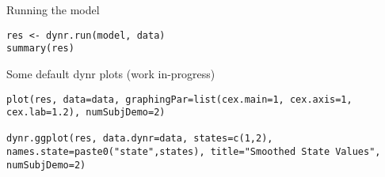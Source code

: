 \begin{frame}[fragile]{Running the model}

\begin{verbatim}
res <- dynr.run(model, data)
summary(res)
\end{verbatim}

\end{frame}

\begin{frame}[fragile]{Some default dynr plots (work in-progress)}

\begin{verbatim}
plot(res, data=data, graphingPar=list(cex.main=1, cex.axis=1, cex.lab=1.2), numSubjDemo=2)

dynr.ggplot(res, data.dynr=data, states=c(1,2), names.state=paste0("state",states), title="Smoothed State Values", numSubjDemo=2)
\end{verbatim}

\end{frame}
